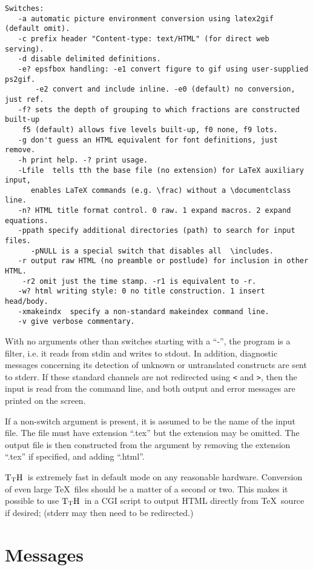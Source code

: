\documentclass[12pt]{article}
\def\TtH{$\rm{}T_TH$}
\begin{document}
{\begin{verbatim}
Switches:
   -a automatic picture environment conversion using latex2gif (default omit). 
   -c prefix header "Content-type: text/HTML" (for direct web serving).
   -d disable delimited definitions.
   -e? epsfbox handling: -e1 convert figure to gif using user-supplied ps2gif.
       -e2 convert and include inline. -e0 (default) no conversion, just ref. 
   -f? sets the depth of grouping to which fractions are constructed built-up
    f5 (default) allows five levels built-up, f0 none, f9 lots. 
   -g don't guess an HTML equivalent for font definitions, just remove.
   -h print help. -? print usage.
   -Lfile  tells tth the base file (no extension) for LaTeX auxiliary input, 
      enables LaTeX commands (e.g. \frac) without a \documentclass line.
   -n? HTML title format control. 0 raw. 1 expand macros. 2 expand equations.
   -ppath specify additional directories (path) to search for input files.
      -pNULL is a special switch that disables all  \includes.
   -r output raw HTML (no preamble or postlude) for inclusion in other HTML.
	-r2 omit just the time stamp. -r1 is equivalent to -r.
   -w? html writing style: 0 no title construction. 1 insert head/body.
   -xmakeindx  specify a non-standard makeindex command line.
   -v give verbose commentary. 
\end{verbatim}
\fi
 }
With no arguments other than switches starting with a ``-'', 
the program is a filter, i.e. it reads from stdin and writes to stdout.
In addition, diagnostic messages concerning its detection of unknown
or untranslated constructs are sent to stderr. If these standard
channels are not redirected using \verb!<! and \verb!>!, then the
input is read from the command line, and both output and error
messages are printed on the screen.

If a non-switch argument is present, it is assumed to be the name of
the input file. The file must have extension ``.tex'' but the extension
may be omitted. The output file is then constructed from the argument
by removing the extension ``.tex'' if specified, and adding ``.html''.

\TtH\ is extremely fast in default mode on any reasonable hardware.
Conversion of even large \TeX\ files should be a matter of a second or
two.
This makes it possible to use \TtH\ in a CGI script to output HTML
directly from \TeX\ source if desired; (stderr may then need to be redirected.)


\section{Messages}
\end{document}
